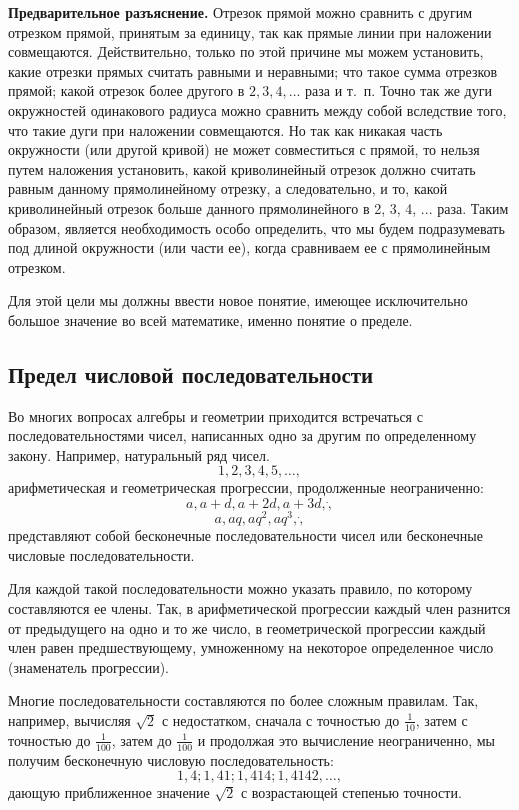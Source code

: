 \documentclass[oneside]{book}
\begin{document}
\textbf{Предварительное разъяснение.}
Отрезок прямой можно сравнить с другим отрезком прямой, принятым за единицу, так как прямые линии при наложении совмещаются.
Действительно, только по этой причине мы можем установить, какие отрезки прямых считать равными и неравными;
что такое сумма отрезков прямой;
какой отрезок более другого в $2, 3, 4,\dots$ раза и т.~п.
Точно так же дуги окружностей одинакового радиуса можно сравнить между собой вследствие того, что такие дуги при наложении совмещаются.
Но так как никакая часть окружности (или другой кривой) не может совместиться с прямой, то нельзя путем наложения установить, какой криволинейный отрезок должно считать равным данному прямолинейному отрезку, а следовательно, и то, какой криволинейный отрезок больше данного прямолинейного в 2, 3, 4, ...
раза.
Таким образом, является необходимость особо определить, что мы будем подразумевать под длиной окружности (или части ее), когда сравниваем ее с прямолинейным отрезком.

Для этой цели мы должны ввести новое понятие, имеющее исключительно большое значение во всей математике, именно понятие о пределе.

\subsection*{Предел числовой последовательности}

Во многих вопросах алгебры и геометрии приходится встречаться с последовательностями чисел, написанных одно за другим по определенному закону.
Например, натуральный ряд чисел.
\[1, 2, 3, 4, 5,\dots,\]
арифметическая и геометрическая прогрессии, продолженные неограниченно:
\[a,a+d,a+2d,a+3d,\dot,\]
\[a,aq,aq^2,aq^3,\dot,\]
представляют собой бесконечные последовательности чисел или бесконечные числовые последовательности.

Для каждой такой последовательности можно указать правило, по которому составляются ее члены.
Так, в арифметической прогрессии каждый член разнится от предыдущего на одно и то же число, в геометрической прогрессии каждый член равен предшествующему, умноженному на некоторое определенное число (знаменатель прогрессии).

Многие последовательности составляются по более сложным правилам.
Так, например, вычисляя $\sqrt{2}$ с недостатком, сначала с точностью до $\tfrac1{10}$, затем с точностью до $\tfrac1{100}$, затем до $\tfrac1{100}$ и продолжая это вычисление неограниченно, мы получим бесконечную числовую последовательность:
\[1{,}4;
1{,}41;
1{,}414;
1{,}4142,\dots,\]
дающую приближенное значение  $\sqrt{2}$  с возрастающей степенью точности.
\end{document}
